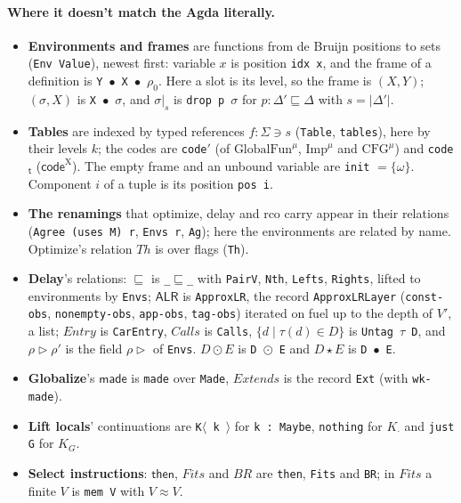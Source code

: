 \documentclass[10pt]{article}
\theoremstyle{acmplain}
\newcommand{\key}[1]{\mathsf{#1}}
\newcommand{\app}{\star}
\newcommand{\Tcut}[2]{#1|_{#2}}                %
\newcommand{\Ml}[1]{\textrm{#1}^{\mu}}                  %
\begin{document}
\paragraph{Where it doesn't match the Agda literally.}
\begin{itemize}
\item \textbf{Environments and frames} are functions from de Bruijn
  positions to sets (\texttt{Env Value}), newest first: variable $x$ is
  position \texttt{idx x}, and the frame of a definition is
  \texttt{Y $\bullet$ X $\bullet$ $\rho_0$}. Here a slot is its level, so the
  frame is $(X, Y)$; $(\sigma, X)$ is \texttt{X $\bullet$ $\sigma$}, and
  $\Tcut{\sigma}{s}$ is \texttt{drop p $\sigma$} for $p : \Delta' \sqsubseteq \Delta$
  with $s = |\Delta'|$.
\item \textbf{Tables} are indexed by typed references $f : \Sigma \ni s$
  (\texttt{Table}, \texttt{tables}), here by their levels $k$; the codes are
  \texttt{code$'$} (of $\Ml{GlobalFun}$, $\Ml{Imp}$ and $\Ml{CFG}$) and
  \texttt{code$_{\mathsf{t}}$} ($\key{code}^{\mathrm{X}}$). The empty frame and
  an unbound variable are \texttt{init} $= \{\omega\}$. Component $i$ of a
  tuple is its position \texttt{pos i}.
\item \textbf{The renamings} that optimize, delay and rco carry appear in
  their relations (\texttt{Agree (uses M) r}, \texttt{Envs r}, \texttt{Ag});
  here the environments are related by name. Optimize's relation
  $\mathit{Th}$ is over flags (\texttt{Th}).
\item \textbf{Delay}'s relations: $\sqsubseteq$ is \texttt{\_}$\sqsubseteq$\texttt{\_} with
  \texttt{PairV}, \texttt{Nth}, \texttt{Lefts}, \texttt{Rights}, lifted to
  environments by \texttt{Envs}; $\mathsf{ALR}$ is \texttt{ApproxLR}, the record
  \texttt{ApproxLRLayer} (\texttt{const-obs}, \texttt{nonempty-obs},
  \texttt{app-obs}, \texttt{tag-obs}) iterated on fuel up to the depth of
  $V'$, a list; $\mathit{Entry}$ is \texttt{CarEntry}, $\mathit{Calls}$ is
  \texttt{Calls}, $\{ d \mid \tau(d) \in D \}$ is \texttt{Untag $\tau$ D},
  and $\rho \rhd \rho'$ is the field \texttt{$\rho\rhd$} of \texttt{Envs}.
  $D \odot E$ is \texttt{D $\odot$ E} and $D \app E$ is \texttt{D $\bullet$ E}.
\item \textbf{Globalize}'s $\key{made}$ is \texttt{made} over \texttt{Made},
  $\mathit{Extends}$ is the record \texttt{Ext} (with \texttt{wk-made}).
\item \textbf{Lift locals}' continuations are \texttt{K$\langle$ k $\rangle$} for
  \texttt{k : Maybe}, \texttt{nothing} for $K_\cdot$ and \texttt{just G} for
  $K_G$.
\item \textbf{Select instructions}: $\key{then}$, $\mathit{Fits}$ and $\mathit{BR}$
  are \texttt{then}, \texttt{Fits} and \texttt{BR}; in $\mathit{Fits}$ a finite
  $V$ is \texttt{mem V} with $V \approx V$.
\end{itemize}
\end{document}
